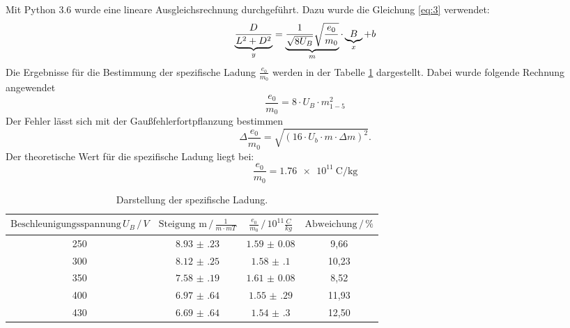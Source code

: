 Mit Python 3.6 wurde eine lineare Ausgleichsrechnung durchgeführt.
Dazu wurde die Gleichung \ref{eq:3} verwendet:
\begin{equation*}
  \underbrace{\frac{D}{L^2+D^2}}_{\mathclap{y}} = \underbrace{\frac{1}{\sqrt{8U_B}} \sqrt{\frac{e_0}{m_0}}}_{\mathclap{m}} \cdot \underbrace{B}_{\mathclap{x}} + b
\end{equation*}
Die Ergebnisse für die Bestimmung der spezifische Ladung $\frac{e_0}{m_0}$ werden
in der Tabelle \ref{tab:6} dargestellt. Dabei wurde folgende Rechnung angewendet
\begin{equation*}
  \frac{e_0}{m_0} = 8 \cdot U_B \cdot m_{1-5}^2
\end{equation*}
Der Fehler lässt sich mit der Gaußfehlerfortpflanzung bestimmen
\begin{equation*}
  \Delta \frac{e_0}{m_0} = \sqrt{(16 \cdot U_b \cdot m \cdot \Delta m)^2}.
\end{equation*}
Der theoretische Wert für die spezifische Ladung liegt bei:
\begin{equation*}
  \frac{e_0}{m_0}=\SI{1.76e11}{\coulomb\per\kilogram}
\end{equation*}

\begin{table}[H]
  \centering
  \caption{Darstellung der spezifische Ladung.}
  \label{tab:6}
  \begin{tabular}{c c c c}
\toprule
$\text{Beschleunigungsspannung}\, U_B \,/\, V$ & $\text{Steigung m} \,/\, \frac{1}{m\cdot mT}$ &$\frac{e_0}{m_0} \,/\, 10^{11}\frac{C}{kg}$ & $\text{Abweichung} \,/\, \%$\\
\midrule
250 &$\num{8.93(23)}$ &$\num{1.59(8)}$ &  9,66\\
300 &$\num{8.12(25)}$ &$\num{1.58(10)}$& 10,23\\
350 &$\num{7.58(19)}$ &$\num{1.61(8)}$ &  8,52\\
400 &$\num{6.97(64)}$ &$\num{1.55(29)}$& 11,93\\
430 &$\num{6.69(64)}$ &$\num{1.54(30)}$& 12,50\\
\bottomrule
  \end{tabular}
\end{table}

